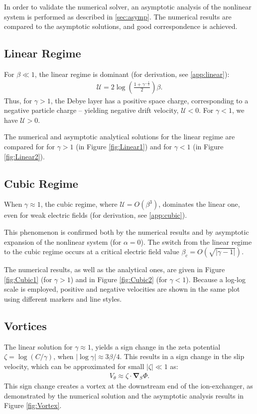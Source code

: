 \documentclass[final]{elsarticle}
\newcommand{\pars}[1]{\left(#1\right)}
\newcommand\bnabla{\boldsymbol{\nabla}}
\newcommand\cU{\mathscr{U}}
\begin{document}
In order to validate the numerical solver, an asymptotic analysis of the nonlinear system
is performed as described in \ref{sec:asymp}. The numerical results are compared 
to the asymptotic solutions, and good correspondence is achieved.

\subsection{Linear Regime}
For $\beta \ll 1$, the linear regime is dominant (for derivation, see \ref{app:linear}):
\begin{eqnarray*}
\cU = 2\log\pars{\frac{1 + \gamma^{-\frac{1}{2}}}{2}}\beta.
\end{eqnarray*}
Thus, for $\gamma > 1$, the Debye layer has a positive space charge, corresponding to a negative
particle charge -- yielding negative drift velocity, $\cU < 0$. 
For $\gamma < 1$, we have $\cU > 0$.

The numerical and asymptotic analytical solutions for the linear regime are compared for 
for $\gamma > 1$ (in Figure \ref{fig:Linear1})  
and for $\gamma < 1$ (in Figure \ref{fig:Linear2}).

\subsection{Cubic Regime}
When $\gamma \approx 1$, the cubic regime, where $\cU = O(\beta^3)$, 
dominates the linear one, even for weak electric fields
(for derivation, see \ref{app:cubic}). 

This phenomenon is confirmed both by the numerical
results and by asymptotic expansion of the nonlinear system (for $\alpha=0$).
The switch from the linear regime to the cubic regime occurs at a critical electric
field value $\beta_c = O(\sqrt{|\gamma - 1|})$.

The numerical results, as well as the analytical ones, are given in Figure
\ref{fig:Cubic1} (for $\gamma > 1$) and in Figure \ref{fig:Cubic2} (for $\gamma < 1$).
Because a log-log scale is employed, positive and negative velocities are shown in
the same plot using different markers and line styles.

\subsection{Vortices}
The linear solution for $\gamma \approx 1$, 
yields a sign change in the zeta potential $\zeta = \log (C/\gamma)$, when
$|\log\gamma| \approx 3\beta / 4$. This results in a sign change in the slip velocity,
which can be approximated for small $|\zeta| \ll 1$ as:
\begin{eqnarray*}
V_\theta \approx \zeta \cdot \bnabla_S \varPhi.
\end{eqnarray*} 
This sign change creates a vortex at the downstream end of the ion-exchanger, 
as demonstrated by the numerical solution and the asymptotic analysis results 
in Figure \ref{fig:Vortex}.
\end{document}
